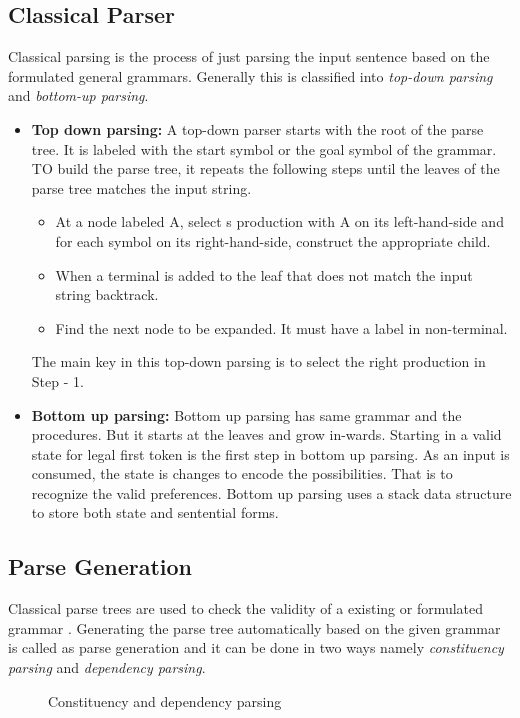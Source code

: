 \documentclass{bmcart}
\begin{document}
\subsection{Classical Parser}
\label{ssec:classicalParser}
Classical parsing is the process of just parsing the input sentence based on the formulated general grammars. Generally this is classified into {\it top-down parsing} and {\it bottom-up parsing}. 
\begin{itemize}
\item {\bf Top down parsing:}
A top-down parser starts with the root of the parse tree. It is labeled with the start symbol or the goal symbol of the grammar. TO build the parse tree, it repeats the following steps until the leaves of the parse tree matches the input string.
\begin{itemize}
\item At a node labeled A, select s production with A on its left-hand-side and for each symbol on its right-hand-side, construct the appropriate child.
\item When a terminal is added to the leaf that does not match the input string backtrack.
\item Find the next node to be expanded. It must have a label in non-terminal.
\end{itemize} The main key in this top-down parsing is to select the right production in Step - 1.
\item {\bf Bottom up parsing:} Bottom up parsing has same grammar and the procedures. But it starts at the leaves and grow in-wards. Starting in a valid state for legal first token is the first step in bottom up parsing. As an input is consumed, the state is changes to encode the possibilities. That is to recognize the valid preferences. Bottom up parsing uses a stack data structure to store both state and sentential forms.
\end{itemize}

\subsection{Parse Generation}
\label{ssec:parseGeneration}
Classical parse trees are used to check the validity of a existing or formulated grammar \cite{Charniak97}. Generating the parse tree automatically based on the given grammar is called as parse generation and it can be done in two ways namely  {\it constituency parsing} and {\it dependency parsing}.
\begin{figure}[h!tb]
\centering
		\caption{Constituency and dependency parsing}
		\label{fig:constituencyParser}
\end{figure}
\end{document}
